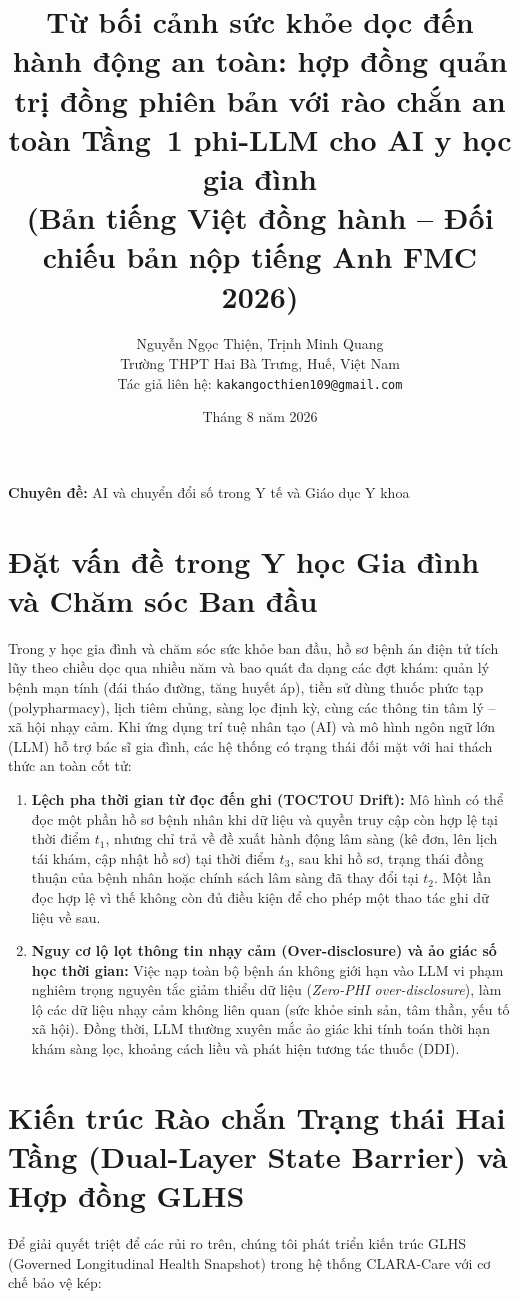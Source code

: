 \documentclass[11pt]{article}
\title{\textbf{Từ bối cảnh sức khỏe dọc đến hành động an toàn: hợp đồng quản trị đồng phiên bản với rào chắn an toàn Tầng~1 phi-LLM cho AI y học gia đình}\\[0.3em]
\large (Bản tiếng Việt đồng hành -- Đối chiếu bản nộp tiếng Anh FMC 2026)}
\author{Nguyễn Ngọc Thiện, Trịnh Minh Quang\\
Trường THPT Hai Bà Trưng, Huế, Việt Nam\\
Tác giả liên hệ: \texttt{kakangocthien109@gmail.com}}
\date{Tháng 8 năm 2026}
\begin{document}
\maketitle
\thispagestyle{empty}

\textbf{Chuyên đề:} AI và chuyển đổi số trong Y tế và Giáo dục Y khoa

\section{Đặt vấn đề trong Y học Gia đình và Chăm sóc Ban đầu}
Trong y học gia đình và chăm sóc sức khỏe ban đầu, hồ sơ bệnh án điện tử tích lũy theo chiều dọc qua nhiều năm và bao quát đa dạng các đợt khám: quản lý bệnh mạn tính (đái tháo đường, tăng huyết áp), tiền sử dùng thuốc phức tạp (polypharmacy), lịch tiêm chủng, sàng lọc định kỳ, cùng các thông tin tâm lý -- xã hội nhạy cảm. Khi ứng dụng trí tuệ nhân tạo (AI) và mô hình ngôn ngữ lớn (LLM) hỗ trợ bác sĩ gia đình, các hệ thống có trạng thái đối mặt với hai thách thức an toàn cốt tử:

\begin{enumerate}[leftmargin=1.8em]
\item \textbf{Lệch pha thời gian từ đọc đến ghi (TOCTOU Drift):} Mô hình có thể đọc một phần hồ sơ bệnh nhân khi dữ liệu và quyền truy cập còn hợp lệ tại thời điểm $t_1$, nhưng chỉ trả về đề xuất hành động lâm sàng (kê đơn, lên lịch tái khám, cập nhật hồ sơ) tại thời điểm $t_3$, sau khi hồ sơ, trạng thái đồng thuận của bệnh nhân hoặc chính sách lâm sàng đã thay đổi tại $t_2$. Một lần đọc hợp lệ vì thế không còn đủ điều kiện để cho phép một thao tác ghi dữ liệu về sau.
\item \textbf{Nguy cơ lộ lọt thông tin nhạy cảm (Over-disclosure) và ảo giác số học thời gian:} Việc nạp toàn bộ bệnh án không giới hạn vào LLM vi phạm nghiêm trọng nguyên tắc giảm thiểu dữ liệu (\emph{Zero-PHI over-disclosure}), làm lộ các dữ liệu nhạy cảm không liên quan (sức khỏe sinh sản, tâm thần, yếu tố xã hội). Đồng thời, LLM thường xuyên mắc ảo giác khi tính toán thời hạn khám sàng lọc, khoảng cách liều và phát hiện tương tác thuốc (DDI).
\end{enumerate}

\section{Kiến trúc Rào chắn Trạng thái Hai Tầng (Dual-Layer State Barrier) và Hợp đồng GLHS}
Để giải quyết triệt để các rủi ro trên, chúng tôi phát triển kiến trúc GLHS (Governed Longitudinal Health Snapshot) trong hệ thống CLARA-Care với cơ chế bảo vệ kép:
\end{document}

